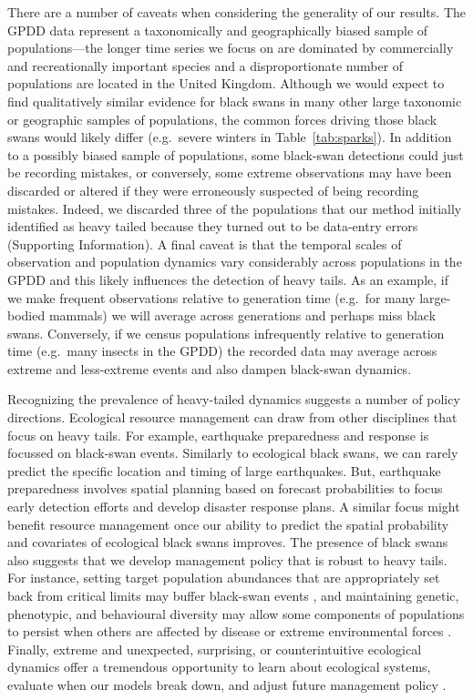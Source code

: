 There are a number of caveats when considering the generality of our results.
The GPDD data represent a taxonomically and geographically biased sample of
populations---the longer time series we focus on are dominated by commercially
and recreationally important species and a disproportionate number of
populations are located in the United Kingdom. Although we would expect to
find qualitatively similar evidence for black swans in many other large
taxonomic or geographic samples of populations, the common forces driving
those black swans would likely differ (e.g.~severe winters in
Table~\ref{tab:sparks}). In addition to a possibly biased sample of
populations, some black-swan detections could just be recording mistakes, or
conversely, some extreme observations may have been discarded or altered if
they were erroneously suspected of being recording mistakes. Indeed, we
discarded three of the populations that our method initially identified as
heavy tailed because they turned out to be data-entry errors (Supporting
Information). A final caveat is that the temporal scales of observation and
population dynamics vary considerably across populations in the GPDD and this
likely influences the detection of heavy tails. As an example, if we make
frequent observations relative to generation time (e.g.~for many large-bodied
mammals) we will average across generations and perhaps miss black swans.
Conversely, if we census populations infrequently relative to generation time
(e.g.~many insects in the GPDD) the recorded data may average across extreme
and less-extreme events and also dampen black-swan dynamics.

Recognizing the prevalence of heavy-tailed dynamics suggests a number of
policy directions. Ecological resource management can draw from other
disciplines that focus on heavy tails. For example, earthquake preparedness
and response is focussed on black-swan events. Similarly to ecological black
swans, we can rarely predict the specific location and timing of large
earthquakes. But, earthquake preparedness involves spatial planning based on
forecast probabilities to focus early detection efforts and develop disaster
response plans. A similar focus might benefit resource management once our
ability to predict the spatial probability and covariates of ecological black
swans improves. The presence of black swans also suggests that we develop
management policy that is robust to heavy tails. For instance, setting target
population abundances that are appropriately set back from critical limits may
buffer black-swan events \citep[e.g.][]{caddy1996}, and maintaining genetic,
phenotypic, and behavioural diversity may allow some components of populations
to persist when others are affected by disease or extreme environmental forces
\citep[e.g.][]{hilborn2003, schindler2010, anderson2014}. Finally, extreme and
unexpected, surprising, or counterintuitive ecological dynamics offer a
tremendous opportunity to learn about ecological systems, evaluate when our
models break down, and adjust future management policy \citep{doak2008,
  pine-iii2009, lindenmayer2010}.

